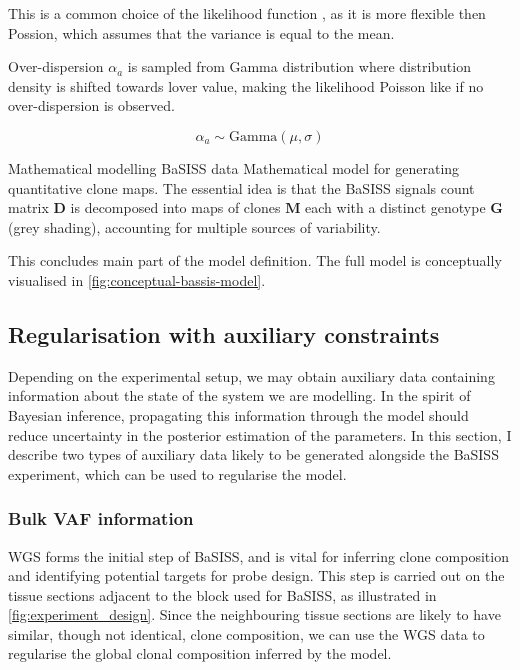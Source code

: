 This is a common choice of the likelihood function \parencite{Kleshchevnikov2022-ch, Townes2023-uj}, as it is more flexible then Possion, which assumes that the variance is equal to the mean.

Over-dispersion $\alpha_a$ is sampled from Gamma distribution where distribution density is shifted towards lover value, making the likelihood Poisson like if no over-dispersion is observed.

\begin{equation}
    {\alpha}_a \sim \mathrm{Gamma}(\mu, \sigma)
\end{equation} 

    {Mathematical modelling \ac{BaSISS} data}
    {Mathematical model for generating quantitative clone maps. The essential idea is that the \ac{BaSISS} signals count matrix $\mathbf{D}$ is decomposed into maps of clones $\mathbf{M}$ each with
    a distinct genotype $\mathbf{G}$ (grey shading), accounting for multiple sources of variability.}


This concludes main part of the model definition. The full model is conceptually visualised in \cref{fig:conceptual-bassis-model}.

\subsection{Regularisation with auxiliary constraints}
Depending on the experimental setup, we may obtain auxiliary data containing information about the state of the system we are modelling. In the spirit of Bayesian inference, propagating this information through the model should reduce uncertainty in the posterior estimation of the parameters. In this section, I describe two types of auxiliary data likely to be generated alongside the \ac{BaSISS} experiment, which can be used to regularise the model.

\subsubsection*{Bulk \acl{VAF} information}

\ac{WGS} forms the initial step of \ac{BaSISS}, and is vital for inferring clone composition and identifying potential targets for probe design. This step is carried out on the tissue sections adjacent to the block used for \ac{BaSISS}, as illustrated in \cref{fig:experiment_design}. Since the neighbouring tissue sections are likely to have similar, though not identical, clone composition, we can use the \ac{WGS} data to regularise the global clonal composition inferred by the model.

